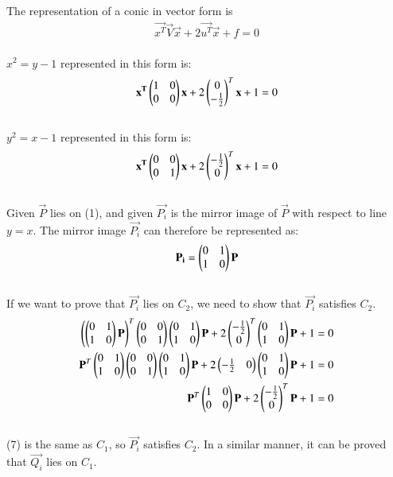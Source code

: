 \documentclass[12pt]{article}
\begin{document}
The representation of a conic in vector form is \begin{align}\vec{x^T}\vec{V}\vec{x} + 2\vec{u^T}\vec{x}+f = 0\end{align}\\
$x^2 = y- 1$ represented in this form is:
\begin{align}\mathbf{x^T}\begin{pmatrix}1&0\\0&0\end{pmatrix}\mathbf{x} + 2\begin{pmatrix}0 \\ -\frac{1}{2}\end{pmatrix}^T\mathbf{x}+1 = 0\end{align}\\
$y^2 = x- 1$ represented in this form is:
\begin{align}\mathbf{x^T}\begin{pmatrix}0&0\\0&1\end{pmatrix}\mathbf{x} + 2\begin{pmatrix}-\frac{1}{2}\\0\end{pmatrix}^T\mathbf{x}+1 = 0\end{align}\\
Given $\vec{P}$ lies on (1), and given $\vec{P_i}$ is the mirror image of $\vec{P}$ with respect to line $y=x$. The mirror image $\vec{P_i}$ can therefore be represented as:
\begin{align} \mathbf{P_i} = \begin{pmatrix}0&1\\1&0\end{pmatrix}\mathbf{P} \end{align}\\
If we want to prove that $\vec{P_i}$ lies on $C_2$, we need to show that $\vec{P_i}$ satisfies $C_2$.
\begin{align}
\left(\begin{pmatrix}0&1\\1&0\end{pmatrix}\mathbf{P}\right)^T\begin{pmatrix}0&0\\0&1\end{pmatrix}\begin{pmatrix}0&1\\1&0\end{pmatrix}\mathbf{P} + 2\begin{pmatrix}-\frac{1}{2}\\0\end{pmatrix}^T\begin{pmatrix}0&1\\1&0\end{pmatrix}\mathbf{P}+1 = 0\\
\mathbf{P}^T\begin{pmatrix}0&1\\1&0\end{pmatrix}\begin{pmatrix}0&0\\0&1\end{pmatrix}\begin{pmatrix}0&1\\1&0\end{pmatrix}\mathbf{P} + 2\begin{pmatrix}-\frac{1}{2}&0\end{pmatrix}\begin{pmatrix}0&1\\1&0\end{pmatrix}\mathbf{P}+1 = 0\\
\mathbf{P}^T\begin{pmatrix}1&0\\0&0\end{pmatrix}\mathbf{P} + 2\begin{pmatrix}-\frac{1}{2}\\0\end{pmatrix}^T\mathbf{P}+1 = 0
\end{align}\\
(7) is the same as $C_1$, so $\vec{P_i}$ satisfies $C_2$. In a similar manner, it can be proved that $\vec{Q_i}$ lies on $C_1$.\vspace{1cm}\\
\end{document}
